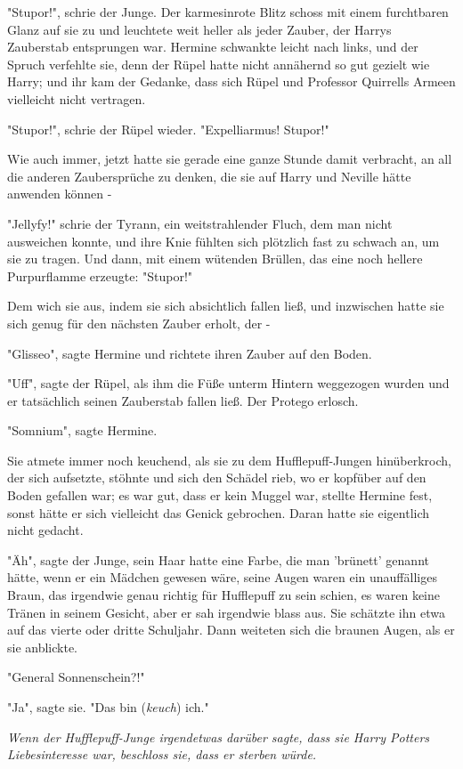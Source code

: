 {"Stupor!", schrie der Junge. Der karmesinrote Blitz schoss mit einem furchtbaren Glanz auf sie zu und leuchtete weit heller als jeder Zauber, der Harrys Zauberstab entsprungen war. Hermine schwankte leicht nach links, und der Spruch verfehlte sie, denn der Rüpel hatte nicht annähernd so gut gezielt wie Harry; und ihr kam der Gedanke, dass sich Rüpel und Professor Quirrells Armeen vielleicht nicht vertragen.

"Stupor!", schrie der Rüpel wieder. "Expelliarmus! Stupor!"

Wie auch immer, jetzt hatte sie gerade eine ganze Stunde damit verbracht, an all die anderen Zaubersprüche zu denken, die sie auf Harry und Neville hätte anwenden können -

"Jellyfy!" schrie der Tyrann, ein weitstrahlender Fluch, dem man nicht ausweichen konnte, und ihre Knie fühlten sich plötzlich fast zu schwach an, um sie zu tragen. Und dann, mit einem wütenden Brüllen, das eine noch hellere Purpurflamme erzeugte: "Stupor!"

Dem wich sie aus, indem sie sich absichtlich fallen ließ, und inzwischen hatte sie sich genug für den nächsten Zauber erholt, der -

"Glisseo", sagte Hermine und richtete ihren Zauber auf den Boden.

"Uff", sagte der Rüpel, als ihm die Füße unterm Hintern weggezogen wurden und er tatsächlich seinen Zauberstab fallen ließ. Der Protego erlosch.

"Somnium", sagte Hermine.

Sie atmete immer noch keuchend, als sie zu dem Hufflepuff-Jungen hinüberkroch, der sich aufsetzte, stöhnte und sich den Schädel rieb, wo er kopfüber auf den Boden gefallen war; es war gut, dass er kein Muggel war, stellte Hermine fest, sonst hätte er sich vielleicht das Genick gebrochen. Daran hatte sie eigentlich nicht gedacht.

"Äh", sagte der Junge, sein Haar hatte eine Farbe, die man 'brünett' genannt hätte, wenn er ein Mädchen gewesen wäre, seine Augen waren ein unauffälliges Braun, das irgendwie genau richtig für Hufflepuff zu sein schien, es waren keine Tränen in seinem Gesicht, aber er sah irgendwie blass aus. Sie schätzte ihn etwa auf das vierte oder dritte Schuljahr. Dann weiteten sich die braunen Augen, als er sie anblickte.

"General Sonnenschein?!"

"Ja", sagte sie. "Das bin (\emph{keuch}) ich."

\emph{Wenn der Hufflepuff-Junge irgendetwas darüber sagte, dass sie Harry Potters Liebesinteresse war, beschloss sie, dass er sterben würde.}

}
